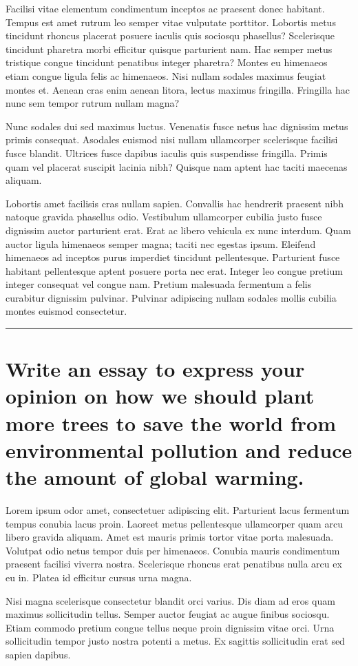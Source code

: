 \documentclass[12pt]{article}
\begin{document}
Facilisi vitae elementum condimentum inceptos ac praesent donec habitant. Tempus est amet rutrum leo semper vitae vulputate porttitor. Lobortis metus tincidunt rhoncus placerat posuere iaculis quis sociosqu phasellus? Scelerisque tincidunt pharetra morbi efficitur quisque parturient nam. Hac semper metus tristique congue tincidunt penatibus integer pharetra? Montes eu himenaeos etiam congue ligula felis ac himenaeos. Nisi nullam sodales maximus feugiat montes et. Aenean cras enim aenean litora, lectus maximus fringilla. Fringilla hac nunc sem tempor rutrum nullam magna?

Nunc sodales dui sed maximus luctus. Venenatis fusce netus hac dignissim metus primis consequat. Asodales euismod nisi nullam ullamcorper scelerisque facilisi fusce blandit. Ultrices fusce dapibus iaculis quis suspendisse fringilla. Primis quam vel placerat suscipit lacinia nibh? Quisque nam aptent hac taciti maecenas aliquam.

Lobortis amet facilisis cras nullam sapien. Convallis hac hendrerit praesent nibh natoque gravida phasellus odio. Vestibulum ullamcorper cubilia justo fusce dignissim auctor parturient erat. Erat ac libero vehicula ex nunc interdum. Quam auctor ligula himenaeos semper magna; taciti nec egestas ipsum. Eleifend himenaeos ad inceptos purus imperdiet tincidunt pellentesque. Parturient fusce habitant pellentesque aptent posuere porta nec erat. Integer leo congue pretium integer consequat vel congue nam. Pretium malesuada fermentum a felis curabitur dignissim pulvinar. Pulvinar adipiscing nullam sodales mollis cubilia montes euismod consectetur.
\vfill
\rule{\textwidth}{0.4pt}
\newpage

\section{Write an essay to express your opinion on how we should plant more trees to save the world from \linebreak environmental pollution and reduce the amount of global warming.}
Lorem ipsum odor amet, consectetuer adipiscing elit. Parturient lacus fermentum tempus conubia lacus proin. Laoreet metus pellentesque ullamcorper quam arcu libero gravida aliquam. Amet est mauris primis tortor vitae porta malesuada. Volutpat odio netus tempor duis per himenaeos. Conubia mauris condimentum praesent facilisi viverra nostra. Scelerisque rhoncus erat penatibus nulla arcu ex eu in. Platea id efficitur cursus urna magna.

Nisi magna scelerisque consectetur blandit orci varius. Dis diam ad eros quam maximus sollicitudin tellus. Semper auctor feugiat ac augue finibus sociosqu. Etiam commodo pretium congue tellus neque proin dignissim vitae orci. Urna sollicitudin tempor justo nostra potenti a metus. Ex sagittis sollicitudin erat sed sapien dapibus.
\end{document}
